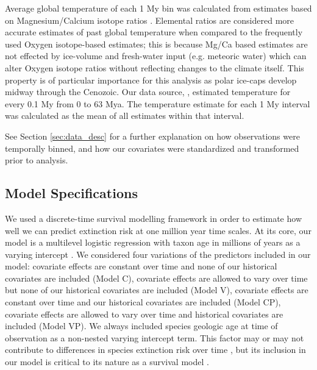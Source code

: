 \documentclass[12pt,letterpaper]{article}
\begin{document}
\begin{refsection}
Average global temperature of each 1 My bin was calculated from estimates based on Magnesium/Calcium isotope ratios \citet{Cramer2011}. Elemental ratios are considered more accurate estimates of past global temperature when compared to the frequently used Oxygen isotope-based estimates; this is because Mg/Ca based estimates are not effected by ice-volume and fresh-water input (e.g. meteoric water) which can alter Oxygen isotope ratios without reflecting changes to the climate itself. This property is of particular importance for this analysis as polar ice-caps develop midway through the Cenozoic. Our data source, \citet{Cramer2011}, estimated temperature for every 0.1 My from 0 to 63 Mya. The temperature estimate for each 1 My interval was calculated as the mean of all estimates within that interval. 

See Section \ref{sec:data_desc} for a further explanation on how observations were temporally binned, and how our covariates were standardized and transformed prior to analysis.




\subsection{Model Specifications}

We used a discrete-time survival modelling framework in order to estimate how well we can predict extinction risk at one million year time scales. At its core, our model is a multilevel logistic regression with taxon age in millions of years as a varying intercept \citep{Tutz2016}. We considered four variations of the predictors included in our model: covariate effects are constant over time and none of our historical covariates are included (Model C), covariate effects are allowed to vary over time but none of our historical covariates are included (Model V), covariate effects are constant over time and our historical covariates are included (Model CP), covariate effects are allowed to vary over time and historical covariates are included (Model VP). We always included species geologic age at time of observation as a non-nested varying intercept term. This factor may or may not contribute to differences in species extinction risk over time \citep{Smits2015,Finnegan2008,Ezard2012,VanValen1973,Liow2011,Crampton2016}, but its inclusion in our model is critical to its nature as a survival model \cite{Tutz2016}.


\end{refsection}
\end{document}
